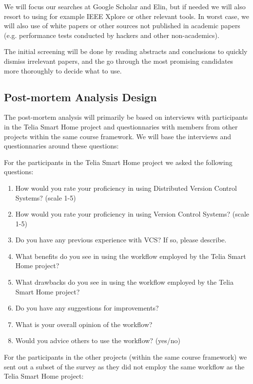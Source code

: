 \documentclass{llncs}
\begin{document}
We will focus our searches at Google Scholar and Elin, but if needed
we will also resort to using for example IEEE Xplore or other relevant
tools. In worst case, we will also use of white papers or other
sources not published in academic papers (e.g. performance tests
conducted by hackers and other non-academics).

The initial screening will be done by reading abstracts and
conclusions to quickly dismiss irrelevant papers, and the go through
the most promising candidates more thoroughly to decide what to use.

\subsection{Post-mortem Analysis Design}

The post-mortem analysis will primarily be based on interviews with
participants in the Telia Smart Home project and questionnaries with
members from other projects within the same course framework. We will
base the interviews and questionnaries around these questions:

For the participants in the Telia Smart Home project we asked the
following questions:

\begin{enumerate}
 \item How would you rate your proficiency in using Distributed
       Version Control Systems? (scale 1-5)
 \item How would you rate your proficiency in using Version Control
       Systems? (scale 1-5)
 \item Do you have any previous experience with VCS? If so, please
       describe.
 \item What benefits do you see in using the workflow employed by the
       Telia Smart Home project?
 \item What drawbacks do you see in using the workflow employed by the
       Telia Smart Home project?
 \item Do you have any suggestions for improvements?
 \item What is your overall opinion of the workflow?
 \item Would you advice others to use the workflow? (yes/no)
\end{enumerate}

For the participants in the other projects (within the same course
framework) we sent out a subset of the survey as they did not employ
the same workflow as the Telia Smart Home project:
\end{document}

